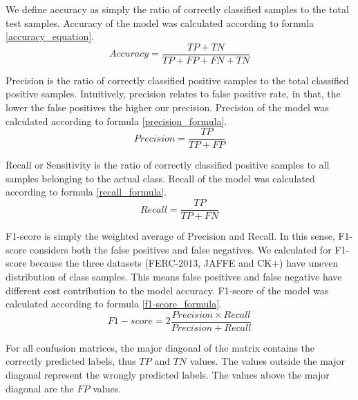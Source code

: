 \documentclass[master]{thesis-uestc}
\begin{document}
We define accuracy as simply the ratio of correctly classified samples to the total test samples. Accuracy of the model was calculated according to formula \ref{accuracy_equation}.
\begin{equation}
Accuracy=\frac{TP + TN}
 {TP + FP + FN + TN}
 \label{accuracy_equation}
\end{equation}

Precision is the ratio of correctly classified positive samples to the total classified positive samples. Intuitively, precision relates to false positive rate, in that, the lower the false positives the higher our precision. Precision of the model was calculated according to formula \ref{precision_formula}.
\begin{equation}
Precision=\frac{TP}
 {TP + FP}
 \label{precision_formula}
\end{equation}

Recall or Sensitivity is the ratio of correctly classified positive samples to all samples belonging to the actual class. Recall of the model was calculated according to formula \ref{recall_formula}.
\begin{equation}
Recall=\frac{TP}
 {TP + FN}
\label{recall_formula}
\end{equation}

F1-score is simply the weighted average of Precision and Recall. In this sense, F1-score considers both the false positives and false negatives. We calculated for F1-score because the three datasets (FERC-2013, JAFFE and CK+) have uneven distribution of class samples. This means false positives and false negative have different cost contribution to the model accuracy. F1-score of the model was calculated according to formula \ref{f1-score_formula}.
\begin{equation}
F1-score=2\frac{Precision \times Recall}
 {Precision + Recall}
\label{f1-score_formula}
\end{equation}

For all confusion matrices, the major diagonal of the matrix contains the correctly predicted labels, thus $TP$ and $TN$ values. The values outside the major diagonal represent the wrongly predicted labels. The values above the major diagonal are the $FP$ values.
\end{document}
